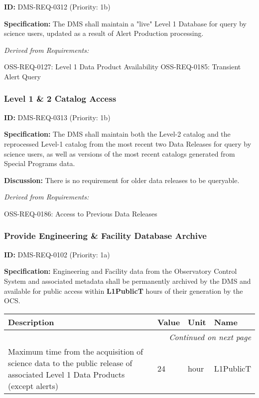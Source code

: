 \documentclass[SE,toc,lsstdraft]{lsstdoc}
\makeatletter
\newcommand{\paramname}[1]{\hspace{0pt}#1}
\newcommand{\unitname}[1]{\hspace{0pt}#1}
\newenvironment{parameters}[0]{%
\setlength\LTleft{0pt}
\setlength\LTright{\fill}
\begin{small}
\begin{longtable}[]{|p{0.49\textwidth}|l|p{0.6in}|p{1.70in}@{}|}

\hline \textbf{Description} & \textbf{Value} & \textbf{Unit} & \textbf{Name} \\ \hline
\endhead

\hline \multicolumn{4}{r}{\emph{Continued on next page}} \\
\endfoot

\hline\hline
\endlastfoot
}{%
\hline
\end{longtable}
\end{small}
}
\makeatother
\begin{document}
\label{DMS-REQ-0312}
\textbf{ID:} DMS-REQ-0312 (Priority: 1b)

\textbf{Specification:} The DMS shall maintain a "live" Level 1 Database for query by science users, updated as a result of Alert Production processing.

\emph{Derived from Requirements:}

OSS-REQ-0127:
Level 1 Data Product Availability \newline
OSS-REQ-0185:
Transient Alert Query \newline

\subsubsection{Level 1 \& 2 Catalog Access}

\label{DMS-REQ-0313}
\textbf{ID:} DMS-REQ-0313 (Priority: 1b)

\textbf{Specification:} The DMS shall maintain both the Level-2 catalog and the reprocessed Level-1 catalog from the most recent two Data Releases for query by science users, as well as versions of the most recent catalogs generated from Special Programs data.

\textbf{Discussion: }There is no requirement for older data releases to be queryable.

\emph{Derived from Requirements:}

OSS-REQ-0186:
Access to Previous Data Releases \newline

\subsubsection{Provide Engineering \& Facility Database Archive}

\label{DMS-REQ-0102}
\textbf{ID:} DMS-REQ-0102 (Priority: 1a)

\textbf{Specification:} Engineering and Facility data from the Observatory Control System and associated metadata shall be permanently archived by the DMS and available for public access within \textbf{L1PublicT} hours of their generation by the OCS.

\begin{parameters}
Maximum time from the acquisition of science data to the public release of associated Level 1 Data Products (except alerts)
&
24
&
\unitname{%
hour
}
&
\paramname{%
L1PublicT
} \\\hline
\end{parameters}
\end{document}
